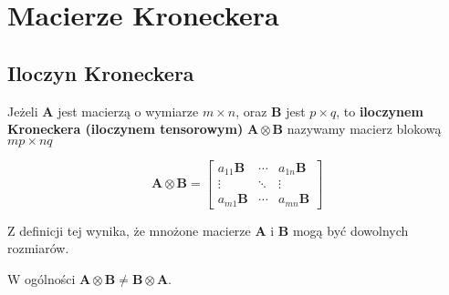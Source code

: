 	\section{Macierze Kroneckera}
	\subsection{Iloczyn Kroneckera}	
		
		Jeżeli \textbf{A} jest macierzą o wymiarze $m \times n$, oraz \textbf{B} jest $p \times q$, to \textbf{iloczynem Kroneckera (iloczynem tensorowym)} $\mathbf{A \otimes B}$ nazywamy macierz blokową $mp \times nq$
		
	$$\mathbf{A \otimes B} = \begin{bmatrix} a_{11} \mathbf{B} & \cdots & a_{1n}\mathbf{B} \\ \vdots & \ddots & \vdots \\ a_{m1} \mathbf{B} & \cdots & a_{mn} \mathbf{B} \end{bmatrix}$$
	
	Z definicji tej wynika, że mnożone macierze \textbf{A} i \textbf{B} mogą być dowolnych rozmiarów.
	
	W ogólności $\mathbf{A \otimes B} \neq \mathbf{B \otimes A}$.
	

